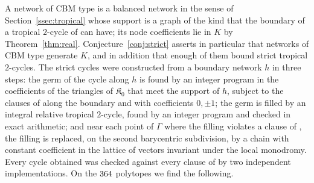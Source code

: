 A network of CBM type is a balanced network in the sense of Section~\ref{ssec:tropical} whose support is a graph of the
kind that the boundary of a tropical $2$-cycle of \cite{CBM} can have; its node coefficients lie in $K$ by
Theorem~\ref{thm:real}. Conjecture~\ref{conj:strict} asserts in particular that networks of CBM type generate $K$, and in
addition that enough of them bound strict tropical $2$-cycles. The strict cycles were constructed from a boundary
network $h$ in three steps: the germ of the cycle along $h$ is found by an integer program in the coefficients of the
triangles of $\mathfrak K_0$ that meet the support of $h$, subject to the clauses of \cite[Def.~7.2]{CBM} along the
boundary and with coefficients $0,\pm1$; the germ is filled by an integral relative tropical $2$-cycle, found by an
integer program and checked in exact arithmetic; and near each point of $\Gamma$ where the filling violates a clause of
\cite[Def.~7.2]{CBM}, the filling is replaced, on the second barycentric subdivision, by a chain with constant coefficient
in the lattice of vectors invariant under the local monodromy. Every cycle obtained was checked against every clause of
\cite[Def.~7.2]{CBM} by two independent implementations. On the $364$ polytopes we find the following.

